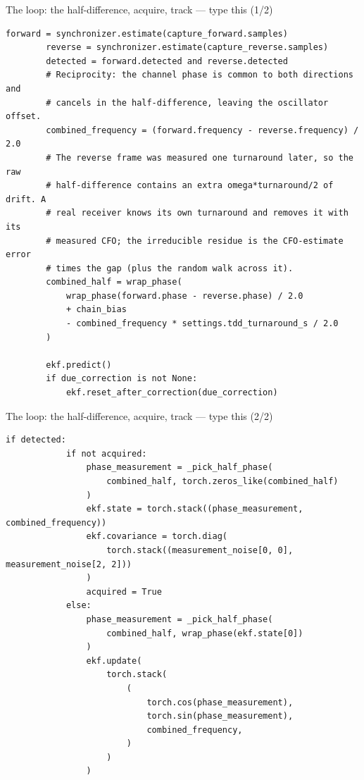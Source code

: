 \documentclass[10pt]{beamer}
\begin{document}
\begin{frame}[fragile]{The loop: the half-difference, acquire, track --- type this (1/2)}
\begin{lstlisting}[basicstyle=\ttfamily\tiny]
        forward = synchronizer.estimate(capture_forward.samples)
        reverse = synchronizer.estimate(capture_reverse.samples)
        detected = forward.detected and reverse.detected
        # Reciprocity: the channel phase is common to both directions and
        # cancels in the half-difference, leaving the oscillator offset.
        combined_frequency = (forward.frequency - reverse.frequency) / 2.0
        # The reverse frame was measured one turnaround later, so the raw
        # half-difference contains an extra omega*turnaround/2 of drift. A
        # real receiver knows its own turnaround and removes it with its
        # measured CFO; the irreducible residue is the CFO-estimate error
        # times the gap (plus the random walk across it).
        combined_half = wrap_phase(
            wrap_phase(forward.phase - reverse.phase) / 2.0
            + chain_bias
            - combined_frequency * settings.tdd_turnaround_s / 2.0
        )

        ekf.predict()
        if due_correction is not None:
            ekf.reset_after_correction(due_correction)
\end{lstlisting}
\end{frame}

\begin{frame}[fragile]{The loop: the half-difference, acquire, track --- type this (2/2)}
\begin{lstlisting}[basicstyle=\ttfamily\tiny]
        if detected:
            if not acquired:
                phase_measurement = _pick_half_phase(
                    combined_half, torch.zeros_like(combined_half)
                )
                ekf.state = torch.stack((phase_measurement, combined_frequency))
                ekf.covariance = torch.diag(
                    torch.stack((measurement_noise[0, 0], measurement_noise[2, 2]))
                )
                acquired = True
            else:
                phase_measurement = _pick_half_phase(
                    combined_half, wrap_phase(ekf.state[0])
                )
                ekf.update(
                    torch.stack(
                        (
                            torch.cos(phase_measurement),
                            torch.sin(phase_measurement),
                            combined_frequency,
                        )
                    )
                )
\end{lstlisting}
\end{frame}
\end{document}
